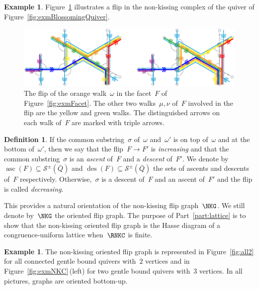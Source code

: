 \documentclass{memo-l}
\theoremstyle{definition}
\newtheorem{definition}[theorem]{Definition}
\newtheorem{example}[theorem]{Example}
\DeclareMathOperator{\ascents}{asc} %
\DeclareMathOperator{\descents}{des} %
\newcommand{\fref}[1]{Figure~\ref{#1}} %
\newcommand{\darkblue}{\color{darkblue}} %
\newcommand{\defn}[1]{\textsl{\darkblue #1}} %
\newcommand{\strings}{\mathcal{S}} %
\begin{document}
\begin{example}
\fref{fig:exmFlip} illustrates a flip in the non-kissing complex of the quiver of \fref{fig:exmBlossomingQuiver}.

\begin{figure}[h]
	\capstart
	\centerline{\includegraphics[scale=.6]{exmFlip}}
	\caption{The flip of the orange walk~$\omega$ in the facet~$F$ of \fref{fig:exmFacet}. The other two walks~$\mu, \nu$ of~$F$ involved in the flip are the yellow and green walks. The distinguished arrows on each walk of~$F$ are marked with triple arrows.}
	\label{fig:exmFlip}
\end{figure}
\end{example}


\begin{definition}
\label{def:increasingFlip}
If the common substring~$\sigma$ of~$\omega$ and~$\omega'$ is on top of~$\omega$ and at the bottom of~$\omega'$, then we say that the flip~$F \to F'$ is \defn{increasing} and that the common substring~$\sigma$ is an \defn{ascent} of~$F$ and a \defn{descent} of~$F'$.
We denote by ${\ascents(F) \subseteq \strings^\pm(\bar Q)}$ and $\descents(F) \subseteq \strings^\pm(\bar Q)$ the sets of ascents and descents of~$F$ respectively.
Otherwise,~$\sigma$ is a descent of~$F$ and an ascent of~$F'$ and the flip is called \defn{decreasing}.
\end{definition}

This provides a natural orientation of the non-kissing flip graph~$\NKG$.
We still denote by~$\NKG$ the oriented flip graph.
The purpose of Part~\ref{part:lattice} is to show that the non-kissing oriented flip graph is the Hasse diagram of a congruence-uniform lattice when~$\RNKC$ is finite.

\begin{example}
The non-kissing oriented flip graph is represented in \fref{fig:all2} for all connected gentle bound quivers with~$2$ vertices and in \fref{fig:exmNKC}\,(left) for two gentle bound quivers with~$3$ vertices.
In all pictures, graphs are oriented bottom-up.
\end{example}
\end{document}
